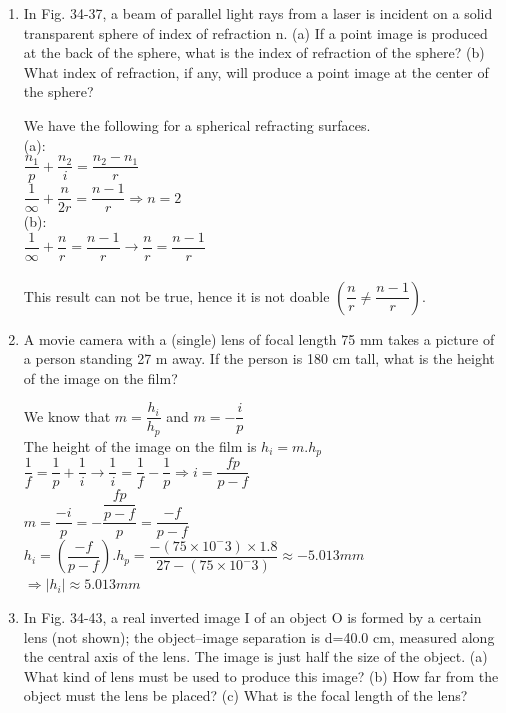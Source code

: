 \documentclass[fleqn]{article}
\begin{document}
\begin{enumerate}
    \item In Fig. 34-37, a beam of parallel light rays from a laser is incident on a solid transparent sphere of index of refraction n. (a) If a point image is produced at the back of the sphere, what is the index of refraction of the sphere? (b) What index of refraction, if any, will produce a point image at the center of the sphere?

    \textcolor{hwColor}{
      We have the following for a spherical refracting surfaces.\\
      (a): \\
      $\dfrac{n_1}{p}+\dfrac{n_2}{i}=\dfrac{n_2-n_1}{r}$ \\
      $\dfrac{1}{\infty}+\dfrac{n}{2r}=\dfrac{n-1}{r} \Longrightarrow n=2$ \\
      \bigbreak
      (b): \\
      $\dfrac{1}{\infty}+\dfrac{n}{r}=\dfrac{n-1}{r} \rightarrow \dfrac{n}{r}=\dfrac{n-1}{r}$ \\
      \\
      This result can not be true, hence it is not doable $(\dfrac{n}{r} \neq \dfrac{n-1}{r})$.
    }
    
    \item A movie camera with a (single) lens of focal length 75 mm takes a picture of a person standing 27 m away. If the person is 180 cm tall, what is the height of the image on the film?

    \textcolor{hwColor}{
      We know that $m=\dfrac{h_i}{h_p}$ and $m=-\dfrac{i}{p}$ \\
      The height of the image on the film is $h_i=m.h_p$ \\
      $\dfrac{1}{f}=\dfrac{1}{p}+\dfrac{1}{i} \rightarrow \dfrac{1}{i}=\dfrac{1}{f}-\dfrac{1}{p} \Longrightarrow i=\dfrac{fp}{p-f}$ \\
      $m=\dfrac{-i}{p}=-\dfrac{\dfrac{fp}{p-f}}{p}=\dfrac{-f}{p-f}$ \\
      $h_i=(\dfrac{-f}{p-f}).h_p=\dfrac{-(75\times10^-3)\times 1.8}{27-(75\times10^-3)}\approx -5.013 mm$ \\
      \bigbreak
      $\Longrightarrow |h_i|\approx 5.013 mm$
    }

    \item In Fig. 34-43, a real inverted image I of an object O is formed by a certain lens (not shown); the object–image separation is d=40.0 cm, measured along the central axis of the lens. The image is just half the size of the object. (a) What kind of lens must be used to produce this image? (b) How far from the object must the lens be placed? (c) What is the focal length of the lens?


\end{enumerate}
\end{document}
